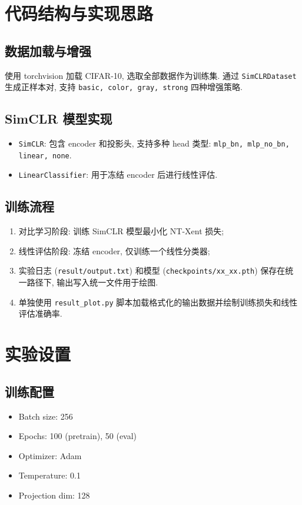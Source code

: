 \documentclass[11pt]{article}
\begin{document}
\section{\textbf{代码结构与实现思路}}

\subsection{数据加载与增强}
使用 torchvision 加载 CIFAR-10, 选取全部数据作为训练集. 通过 \texttt{SimCLRDataset} 生成正样本对, 支持 \texttt{basic, color, gray, strong} 四种增强策略.

\subsection{SimCLR 模型实现}
\begin{itemize}
\item \texttt{SimCLR}: 包含 encoder 和投影头, 支持多种 head 类型: \texttt{mlp\_bn, mlp\_no\_bn, linear, none}.
\item \texttt{LinearClassifier}: 用于冻结 encoder 后进行线性评估.
\end{itemize}

\subsection{训练流程}
\begin{enumerate}
\item 对比学习阶段: 训练 SimCLR 模型最小化 NT-Xent 损失;
\item 线性评估阶段: 冻结 encoder, 仅训练一个线性分类器;
\item 实验日志 (\texttt{result/output.txt}) 和模型 (\texttt{checkpoints/xx\_xx.pth}) 保存在统一路径下, 输出写入统一文件用于绘图.
\item 单独使用 \texttt{result\_plot.py} 脚本加载格式化的输出数据并绘制训练损失和线性评估准确率.
\end{enumerate}

\section{\textbf{实验设置}}

\subsection{训练配置}
\begin{itemize}
\item Batch size: 256
\item Epochs: 100 (pretrain), 50 (eval)
\item Optimizer: Adam
\item Temperature: 0.1
\item Projection dim: 128
\end{itemize}
\end{document}

